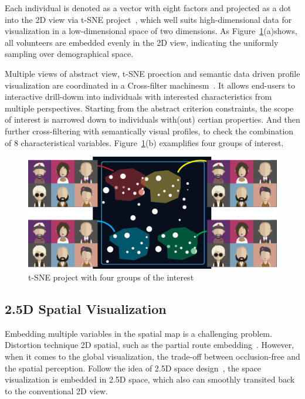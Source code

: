 Each individual is denoted as a vector with eight factors and projected as a dot into the 2D view via t-SNE project~\cite{maaten2008visualizing}, which well suits high-dimensional data for visualization in a low-dimensional space of two dimensions. As Figure~\ref{fig:tsne}(a)shows, all volunteers are embedded evenly in the 2D view, indicating the uniformly sampling over demographical space. 

Multiple views of abstract view, t-SNE proection and semantic data driven profile visualization are coordinated in a Cross-filter machinesm~\cite{Weaver2010}. It allows end-users to interactive drill-dowm into individuals with interested characteristics from multiple perspectives. Starting from the abstract criterion constraints, the scope of interest is narrowed down to individuals with(out) certian properties. And then further cross-filtering with semantically visual profiles, to check the combination of 8 characteristical variables. Figure~\ref{fig:tsne}(b) examplifies four groups of interest. 

\begin{figure}[htb!]
 \centering %
 \includegraphics[width=\columnwidth]{pictures/mds}
 \caption{t-SNE project with four groups of the interest}
 \label{fig:tsne}
\end{figure}

\subsection{2.5D Spatial Visualization}

Embedding multiple variables in the spatial map is a challenging problem. Distortion technique 2D spatial, such as the partial route embedding~\cite{sun2016embedding}. However, when it comes to the global visualization, the trade-off between occlusion-free and the spatial perception. Follow the idea of 2.5D space design~\cite{Tominski2012_stacking}, the space visualization is embedded in 2.5D space, which also can smoothly transited back to the conventional 2D view.  

